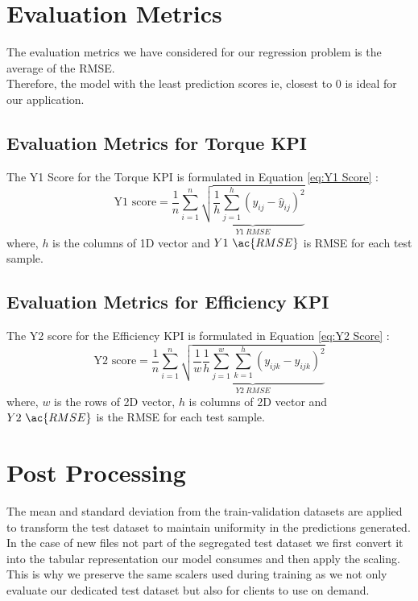 \documentclass{report} %
\begin{document}
\section{Evaluation Metrics}
The evaluation metrics we have considered for our regression problem is the average of the \ac{RMSE}. \\
Therefore, the model with the least prediction scores ie, closest to 0 is ideal for our application. \\

\subsection{Evaluation Metrics for Torque \ac{KPI}}\label{sec:Evaluation Metrics for 2D KPI}
The Y1 Score for the Torque \ac{KPI} is formulated in Equation \ref{eq:Y1 Score} :
\begin{equation}
\text{Y1 score} = \frac{1}{n} \sum_{i=1}^{n} \underbrace{ \sqrt{\frac{1}{h} \sum_{j=1}^{h} (y_{ij} - \hat{y}_{ij})^2}}_{Y1\ RMSE}
\label{eq:Y1 Score}
\end{equation}
where, \(h\) is the columns of 1D vector and \(Y1\ \ac{RMSE}\) is \ac{RMSE} for each test sample.

\subsection{Evaluation Metrics for Efficiency \ac{KPI}}\label{sec:Evaluation Metrics for 3D KPI}
The Y2 score for the Efficiency \ac{KPI} is formulated in Equation \ref{eq:Y2 Score} :
\begin{equation}
    \text{Y2 score} = \frac{1}{n} \sum_{i=1}^{n} \underbrace{ \sqrt{\frac{1}{w} \frac{1}{h} \sum_{j=1}^{w} \sum_{k=1}^{h} (y_{ijk} - \hat{y}_{ijk})^2}}_{Y2\ RMSE}
    \label{eq:Y2 Score}
\end{equation}
where, \(w\) is the rows of 2\ac{D} vector, \(h\) is columns of 2\ac{D} vector and \(Y2\ \ac{RMSE}\) is the \ac{RMSE} for each test sample.

\section{Post Processing}\label{sec:Post Processing}
The mean and standard deviation from the train-validation datasets are applied to transform the test dataset to maintain uniformity in the predictions generated.
In the case of new files not part of the segregated test dataset we first convert it into the tabular representation our model consumes and then apply the scaling.\\
This is why we preserve the same scalers used during training as we not only evaluate our dedicated test dataset but also for clients to use on demand. 
\end{document}
